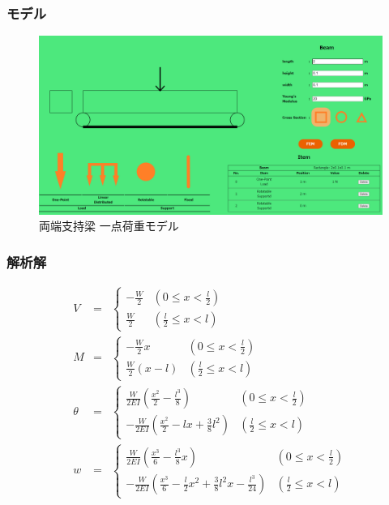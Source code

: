 \documentclass{jsarticle}
\begin{document}
\subsubsection{モデル}
\begin{figure}[H]
\begin{center}
\includegraphics[width=13cm]{simple_one_model.PNG}
\caption{両端支持梁 一点荷重モデル}
\end{center}
\end{figure}

\subsubsection{解析解}

\begin{eqnarray*}
V &=& \left\{ \begin{array}{ll}
    -\frac{W}{2} & (0\leq x<\frac{l}{2}) \\
    \frac{W}{2} & (\frac{l}{2}\leq x < l)
  \end{array} \right. \\
M &=& \left\{ \begin{array}{ll}
    -\frac{W}{2}x & (0\leq x<\frac{l}{2}) \\
    \frac{W}{2}(x-l) & (\frac{l}{2}\leq x < l)
  \end{array} \right. \\
\theta &=& \left\{ \begin{array}{ll}
    \frac{W}{2EI}\left(\frac{x^2}{2}-\frac{l^3}{8}\right) & (0\leq x<\frac{l}{2}) \\
    -\frac{W}{2EI}\left(\frac{x^2}{2}-lx+\frac{3}{8}l^2\right) & (\frac{l}{2}\leq x < l)
  \end{array} \right. \\
w &=& \left\{ \begin{array}{ll}
    \frac{W}{2EI}\left(\frac{x^3}{6}-\frac{l^3}{8}x\right) & (0\leq x<\frac{l}{2}) \\
    -\frac{W}{2EI}\left(\frac{x^3}{6}-\frac{l}{2}x^2+\frac{3}{8}l^2x-\frac{l^3}{24}\right) & (\frac{l}{2}\leq x < l)
  \end{array} \right.
\end{eqnarray*}
\end{document}
